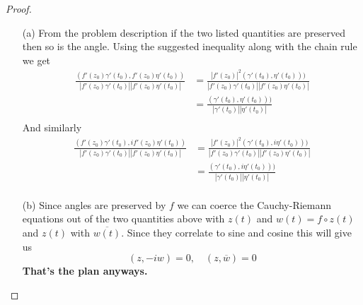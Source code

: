 \documentclass[10pt]{article}
\newcommand{\sk}{\vskip 10mm}
\newcommand{\conj}[1]{\overline{#1}}
\theoremstyle{remark}
\theoremstyle{remark}
\begin{document}
\begin{proof}
  \begin{enumerate}
  \item[(a)] From the problem description if the two listed quantities are
    preserved then so is the angle. Using the suggested inequality along
    with the chain rule we get
    \begin{align*}
      \frac{(f'(z_0)\gamma'(t_0),f'(z_0)\eta'(t_0))}{|f'(z_0)\gamma'(t_0)||f'(z_0)\eta'(t_0)|}&=\frac{|f'(z_0)|^2(\gamma'(t_0),\eta'(t_0)))}{|f'(z_0)\gamma'(t_0)||f'(z_0)\eta'(t_0)|}\\
      &= \frac{(\gamma'(t_0),\eta'(t_0)))}{|\gamma'(t_0)||\eta'(t_0)|}\\
    \end{align*}
    And similarly
    \begin{align*}
      \frac{(f'(z_0)\gamma'(t_0),if'(z_0)\eta'(t_0))}{|f'(z_0)\gamma'(t_0)||f'(z_0)\eta'(t_0)|}&=\frac{|f'(z_0)|^2(\gamma'(t_0),i\eta'(t_0)))}{|f'(z_0)\gamma'(t_0)||f'(z_0)\eta'(t_0)|}\\
      &= \frac{(\gamma'(t_0),i\eta'(t_0)))}{|\gamma'(t_0)||\eta'(t_0)|}\\
    \end{align*}
  \item[(b)] Since angles are preserved by $f$ we can coerce the Cauchy-Riemann
    equations out of the two quantities above with $z(t)$ and $w(t)=f\circ z(t)$
    and $z(t)$ with $\conj{w(t)}$. Since they correlate to sine and cosine this
    will give us
    \[
      (z,-iw)=0,\quad (z,\conj{w})=0
    \]
    \textbf{That's the plan anyways.}
  \end{enumerate}
\end{proof}

\sk

\end{document}
